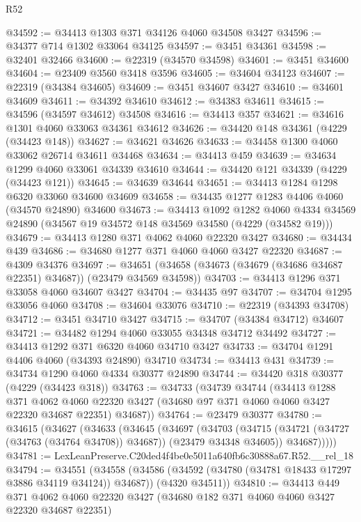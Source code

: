 \begin{lexlean}{R52}
\begin{coremodule}
@34592 := @34413 @1303 @371 @34126 @4060 @34508 @3427
@34596 := @34377 @714 @1302 @33064 @34125
@34597 := @3451 @34361
@34598 := @32401 @32466
@34600 := @22319 (@34570 @34598)
@34601 := @3451 @34600
@34604 := @23409 @3560 @3418 @3596
@34605 := @34604 @34123
@34607 := @22319 (@34384 @34605)
@34609 := @3451 @34607 @3427
@34610 := @34601 @34609
@34611 := @34392 @34610
@34612 := @34383 @34611
@34615 := @34596 (@34597 @34612) @34508
@34616 := @34413 @357
@34621 := @34616 @1301 @4060 @33063 @34361 @34612
@34626 := @34420 @148 @34361 (@4229 (@34423 @148))
@34627 := @34621 @34626
@34633 := @34458 @1300 @4060 @33062 @26714 @34611 @34468
@34634 := @34413 @459
@34639 := @34634 @1299 @4060 @33061 @34339 @34610
@34644 := @34420 @121 @34339 (@4229 (@34423 @121))
@34645 := @34639 @34644
@34651 := @34413 @1284 @1298 @6320 @33060 @34600 @34609
@34658 := @34435 @1277 @1283 @4406 @4060 (@34570 @24890) @34600
@34673 := @34413
    @1092
    @1282
    @4060
    @4334
    @34569
    @24890
    (@34567 @19 @34572 @148 @34569 @34580 (@4229 (@34582 @19)))
@34679 := @34413 @1280 @371 @4062 @4060 @22320 @3427
@34680 := @34434 @439
@34686 := @34680 @1277 @371 @4060 @4060 @3427 @22320
@34687 := @4309 @34376
@34697 := @34651 (@34658 (@34673 (@34679 (@34686 @34687 @22351) @34687)) (@23479 @34569 @34598))
@34703 := @34413 @1296 @371 @33058 @4060 @34607 @3427
@34704 := @34435 @97
@34707 := @34704 @1295 @33056 @4060
@34708 := @34604 @33076
@34710 := @22319 (@34393 @34708)
@34712 := @3451 @34710 @3427
@34715 := @34707 (@34384 @34712) @34607
@34721 := @34482 @1294 @4060 @33055 @34348 @34712 @34492
@34727 := @34413 @1292 @371 @6320 @4060 @34710 @3427
@34733 := @34704 @1291 @4406 @4060 (@34393 @24890) @34710
@34734 := @34413 @431
@34739 := @34734 @1290 @4060 @4334 @30377 @24890
@34744 := @34420 @318 @30377 (@4229 (@34423 @318))
@34763 := @34733
    (@34739
      @34744
      (@34413
        @1288
        @371
        @4062
        @4060
        @22320
        @3427
        (@34680 @97 @371 @4060 @4060 @3427 @22320 @34687 @22351)
        @34687))
@34764 := @23479 @30377
@34780 := @34615
    (@34627
      (@34633
        (@34645
          (@34697
            (@34703
              (@34715 (@34721 (@34727 (@34763 (@34764 @34708)) @34687)) (@23479 @34348 @34605))
              @34687)))))
@34781 := LexLeanPreserve.C20ded4f4be0e5011a640fb6c30888a67.R52.__rel_18
@34794 := @34551
    (@34558
      (@34586 (@34592 (@34780 (@34781 @18433 @17297 @3886 @34119 @34124)) @34687))
      (@4320 @34511))
@34810 := @34413
    @449
    @371
    @4062
    @4060
    @22320
    @3427
    (@34680 @182 @371 @4060 @4060 @3427 @22320 @34687 @22351)

\end{coremodule}
\end{lexlean}
